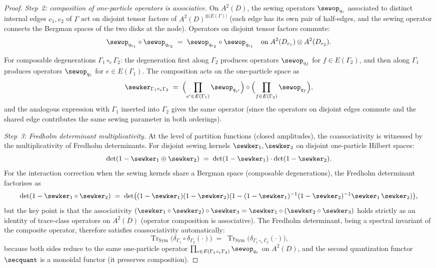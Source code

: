 \begin{proof}
\emph{Step~2: composition of one-particle operators is associative.}
On $A^2(D)$, the sewing operators $\sewop_{q_e}$ associated to
distinct internal edges $e_1, e_2$ of $\Gamma$ act on disjoint tensor
factors of $A^2(D)^{\otimes |E(\Gamma)|}$ (each edge has its own
pair of half-edges, and the sewing operator connects the Bergman
spaces of the two disks at the node). Operators on disjoint tensor
factors commute:
\begin{equation}\label{eq:heisenberg-operator-commutation}
\sewop_{q_{e_1}} \circ \sewop_{q_{e_2}}
\;=\;
\sewop_{q_{e_2}} \circ \sewop_{q_{e_1}}
\quad\text{on}\;
A^2(D_{e_1}) \otimes A^2(D_{e_2}).
\end{equation}

For composable degenerations $\Gamma_1 \circ_e \Gamma_2$: the
degeneration first along $\Gamma_2$ produces operators $\sewop_{q_f}$
for $f \in E(\Gamma_2)$, and then along $\Gamma_1$ produces operators
$\sewop_{q_e}$ for $e \in E(\Gamma_1)$. The composition acts on
the one-particle space as
\[
\sewker_{\Gamma_1 \circ_e \Gamma_2}
\;=\;
\Bigl(\prod_{e' \in E(\Gamma_1)} \sewop_{q_{e'}}\Bigr)
\circ
\Bigl(\prod_{f \in E(\Gamma_2)} \sewop_{q_f}\Bigr),
\]
and the analogous expression with $\Gamma_1$ inserted into $\Gamma_2$
gives the same operator (since the operators on disjoint edges commute
and the shared edge contributes the same sewing parameter in both
orderings).

\emph{Step~3: Fredholm determinant multiplicativity.}
At the level of partition functions (closed amplitudes), the
coassociativity is witnessed by the multiplicativity of Fredholm
determinants. For disjoint sewing kernels
$\sewker_1, \sewker_2$ on disjoint one-particle Hilbert spaces:
\begin{equation}\label{eq:heisenberg-fredholm-multiplicativity}
\det(1 - \sewker_1 \oplus \sewker_2)
\;=\;
\det(1 - \sewker_1) \cdot \det(1 - \sewker_2).
\end{equation}
For the interaction correction when the sewing kernels share
a Bergman space (composable degenerations), the Fredholm
determinant factorises as
\begin{equation}\label{eq:heisenberg-fredholm-composition}
\det(1 - \sewker_1 \circ \sewker_2)
\;=\;
\det\bigl((1 - \sewker_1)(1 - \sewker_2)
(1 - (1-\sewker_1)^{-1}(1-\sewker_2)^{-1}
\sewker_1\,\sewker_2)\bigr),
\end{equation}
but the key point is that the associativity
$(\sewker_1 \circ \sewker_2) \circ \sewker_3
= \sewker_1 \circ (\sewker_2 \circ \sewker_3)$
holds strictly as an identity of trace-class operators on $A^2(D)$
(operator composition is associative). The Fredholm determinant,
being a spectral invariant of the composite operator, therefore
satisfies coassociativity automatically:
\[
\operatorname{Tr}_{\mathrm{Sym}}\!\bigl(
\delta_{\Gamma_1} \circ \delta_{\Gamma_2}(\cdot)\bigr)
\;=\;
\operatorname{Tr}_{\mathrm{Sym}}\!\bigl(
\delta_{\Gamma_1 \circ_e \Gamma_2}(\cdot)\bigr),
\]
because both sides reduce to the same one-particle operator
$\prod_{e \in E(\Gamma_1 \circ_e \Gamma_2)} \sewop_{q_e}$
on $A^2(D)$, and the second quantization functor $\secquant$ is
a monoidal functor (it preserves composition).


\end{proof}

